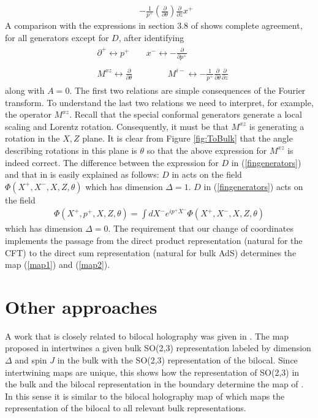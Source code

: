 \documentclass[a4paper,12pt]{article}
\def\bea{\begin{eqnarray}}
\def\eea{\end{eqnarray}}
\begin{document}
\begin{appendix}
\begin{eqnarray}
& &  - \frac{1}{p^{+}}\left(\frac{\partial}{\partial \theta}\right) \frac{\partial}{\partial z} x^{+}
\label{fingenerators}
\end{eqnarray}
%
A comparison with the expressions in section 3.8 of \cite{Metsaev:1999ui} shows complete agreement, for all generators
except for $D$, after identifying
%
\begin{eqnarray}
\begin{matrix}
&\partial^{+}  \longleftrightarrow  p^{+}& &x^{-}  \longleftrightarrow - \frac{\partial}{\partial p^{+}} \\
&   &\\
&M^{xz} \longleftrightarrow \frac{\partial}{\partial \theta}& 
&\qquad\,\,\, M^{i-}\longleftrightarrow - \frac{1}{p^{+}}\frac{\partial}{\partial \theta}\frac{\partial}{\partial z} 
\end{matrix}
\end{eqnarray}
%
along with $A = 0$. 
The first two relations are simple consequences of the Fourier transform.
To understand the last two relations we need to interpret, for example, the operator $M^{xz}$.
Recall that the special conformal generators generate a local scaling and Lorentz rotation.
Consequently, it must be that $M^{xz}$ is generating a rotation in the $X,Z$ plane. 
It is clear from Figure \ref{fig:ToBulk} that the angle describing rotations in this plane is $\theta$ so that the above
expression for $M^{xz}$ is indeed correct.
The difference between the expression for $D$ in (\ref{fingenerators}) and that in \cite{Metsaev:1999ui} is easily
explained as follows: $D$ in \cite{Metsaev:1999ui} acts on the field $\Phi(X^+,X^-,X,Z,\theta)$ which has dimension
$\Delta =1$. $D$ in (\ref{fingenerators}) acts on the field
%
\bea
\Phi(X^+,p^+,X,Z,\theta)=\int dX^- e^{ip^+X^-}\Phi(X^+,X^-,X,Z,\theta)
\eea
%
which has dimension $\Delta=0$.
The requirement that our change of coordinates implements the passage from the direct product representation (natural for 
the CFT) to the direct sum representation (natural for bulk AdS) determines the map (\ref{map1}) and (\ref{map2}).

\section{Other approaches}

A work that is closely related to bilocal holography was given in \cite{Aharony:2020omh}.
The map proposed in \cite{Aharony:2020omh} intertwines a given bulk SO(2,3) representation labeled by
dimension $\Delta$ and spin $J$ in the bulk  with the SO(2,3) representation of the bilocal.
Since intertwining maps are unique, this shows how the representation of SO(2,3) in the bulk and the bilocal
representation in the boundary determine the map of \cite{Aharony:2020omh}.
In this sense it is similar to the bilocal holography map of \cite{Koch:2010cy} which maps the representation
of the bilocal to all relevant bulk representations.


\end{appendix}
\end{document}
